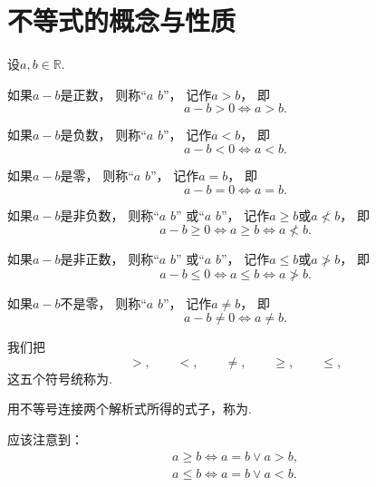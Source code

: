 \section{不等式的概念与性质}
\begin{definition}
设\(a,b\in\mathbb{R}\).

如果\(a-b\)是正数，
则称“\(a\)  \(b\)”，
记作\(a>b\)，
即\begin{equation*}
	a-b>0
	\iff
	a>b.
\end{equation*}

如果\(a-b\)是负数，
则称“\(a\)  \(b\)”，
记作\(a<b\)，
即\begin{equation*}
	a-b<0
	\iff
	a<b.
\end{equation*}

如果\(a-b\)是零，
则称“\(a\)  \(b\)”，
记作\(a=b\)，
即\begin{equation*}
	a-b=0
	\iff
	a=b.
\end{equation*}

如果\(a-b\)是非负数，
则称“\(a\)  \(b\)”
或“\(a\)  \(b\)”，
记作\(a \geq b\)或\(a \nless b\)，
即\begin{equation*}
	a-b\geq0
	\iff
	a \geq b
	\iff
	a \nless b.
\end{equation*}

如果\(a-b\)是非正数，
则称“\(a\)  \(b\)”
或“\(a\)  \(b\)”，
记作\(a \leq b\)或\(a \ngtr b\)，
即\begin{equation*}
	a-b\leq0
	\iff
	a \leq b
	\iff
	a \ngtr b.
\end{equation*}

如果\(a-b\)不是零，
则称“\(a\)  \(b\)”，
记作\(a \neq b\)，
即\begin{equation*}
	a-b\neq0
	\iff
	a \neq b.
\end{equation*}

我们把\begin{equation*}
	>, \qquad
	<, \qquad
	\neq, \qquad
	\geq, \qquad
	\leq,
\end{equation*}这五个符号统称为.

用不等号连接两个解析式所得的式子，称为.
\end{definition}
应该注意到：\begin{gather*}
	a \geq b \iff a = b \lor a > b, \\
	a \leq b \iff a = b \lor a < b.
\end{gather*}

